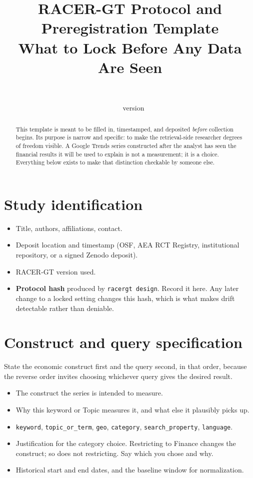 \documentclass[12pt,a4paper,oneside]{article}
\title{\bfseries RACER-GT Protocol and Preregistration Template\\[0.4em]
\large What to Lock Before Any Data Are Seen}
\author{\racerauthor\\\small \raceraffil}
\date{\racerdate\ \textbullet\ version \racerversion}
\begin{document}
\maketitle

\begin{abstract}
\noindent This template is meant to be filled in, timestamped, and deposited
\emph{before} collection begins. Its purpose is narrow and specific: to make the
retrieval-side researcher degrees of freedom visible. A Google Trends series
constructed after the analyst has seen the financial results it will be used to
explain is not a measurement; it is a choice. Everything below exists to make
that distinction checkable by someone else.
\end{abstract}

\tableofcontents
\newpage

\section{Study identification}

\begin{itemize}
\item Title, authors, affiliations, contact.
\item Deposit location and timestamp (OSF, AEA RCT Registry, institutional
repository, or a signed Zenodo deposit).
\item RACER-GT version used.
\item \textbf{Protocol hash} produced by \texttt{racergt design}. Record it here.
Any later change to a locked setting changes this hash, which is what makes
drift detectable rather than deniable.
\end{itemize}

\section{Construct and query specification}

State the economic construct first and the query second, in that order, because
the reverse order invites choosing whichever query gives the desired result.

\begin{itemize}
\item The construct the series is intended to measure.
\item Why this keyword or Topic measures it, and what else it plausibly picks up.
\item \texttt{keyword}, \texttt{topic\_or\_term}, \texttt{geo},
\texttt{category}, \texttt{search\_property}, \texttt{language}.
\item Justification for the category choice. Restricting to Finance changes the
construct; so does not restricting. Say which you chose and why.
\item Historical start and end dates, and the baseline window for normalization.
\end{itemize}
\end{document}
